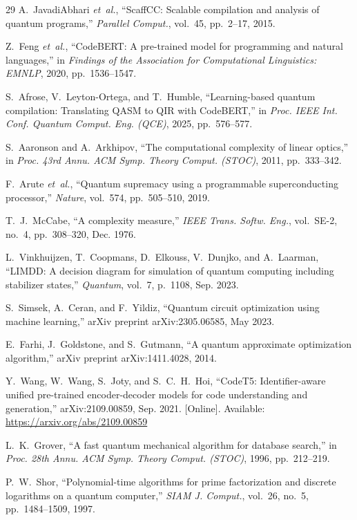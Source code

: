\documentclass[10pt,conference]{IEEEtran}
\begin{document}
\begin{thebibliography}{29}
A.~JavadiAbhari \emph{et~al.}, ``ScaffCC: Scalable compilation and analysis of quantum programs,'' \emph{Parallel Comput.}, vol.~45, pp.~2--17, 2015.

Z.~Feng \emph{et~al.}, ``CodeBERT: A pre-trained model for programming and natural languages,'' in \emph{Findings of the Association for Computational Linguistics: EMNLP}, 2020, pp.~1536--1547.

S.~Afrose, V.~Leyton-Ortega, and T.~Humble, ``Learning-based quantum compilation: Translating QASM to QIR with CodeBERT,'' in \emph{Proc. IEEE Int. Conf. Quantum Comput. Eng. (QCE)}, 2025, pp.~576--577.

S.~Aaronson and A.~Arkhipov, ``The computational complexity of linear optics,'' in \emph{Proc. 43rd Annu. ACM Symp. Theory Comput. (STOC)}, 2011, pp.~333--342.

F.~Arute \emph{et~al.}, ``Quantum supremacy using a programmable superconducting processor,'' \emph{Nature}, vol.~574, pp.~505--510, 2019.

T.~J.~McCabe, ``A complexity measure,'' \emph{IEEE Trans. Softw. Eng.}, vol.~SE-2, no.~4, pp.~308--320, Dec. 1976.

L.~Vinkhuijzen, T.~Coopmans, D.~Elkouss, V.~Dunjko, and A.~Laarman, ``LIMDD: A decision diagram for simulation of quantum computing including stabilizer states,'' \emph{Quantum}, vol.~7, p.~1108, Sep. 2023.

S.~Simsek, A.~Ceran, and F.~Yildiz, ``Quantum circuit optimization using machine learning,'' arXiv preprint arXiv:2305.06585, May 2023.

E.~Farhi, J.~Goldstone, and S.~Gutmann, ``A quantum approximate optimization algorithm,'' arXiv preprint arXiv:1411.4028, 2014.

Y.~Wang, W.~Wang, S.~Joty, and S.~C.~H.~Hoi, ``CodeT5: Identifier-aware unified pre-trained encoder-decoder models for code understanding and generation,'' arXiv:2109.00859, Sep. 2021. [Online]. Available: \url{https://arxiv.org/abs/2109.00859}

L.~K.~Grover, ``A fast quantum mechanical algorithm for database search,'' in \emph{Proc. 28th Annu. ACM Symp. Theory Comput. (STOC)}, 1996, pp.~212--219.

P.~W.~Shor, ``Polynomial-time algorithms for prime factorization and discrete logarithms on a quantum computer,'' \emph{SIAM J. Comput.}, vol.~26, no.~5, pp.~1484--1509, 1997.


\end{thebibliography}
\end{document}
